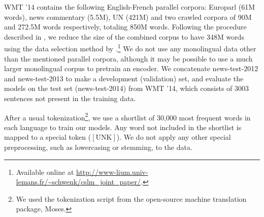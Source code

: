 WMT '14 contains the following English-French parallel corpora: Europarl (61M
words), news commentary (5.5M), UN (421M) and two crawled corpora of 90M and
272.5M words respectively, totaling 850M words. 
Following the procedure described
in \citet{Cho2014}, we reduce the size of the combined corpus to have 348M words
using the data selection method by \citet{Axelrod2011}.\footnote{
    Available online at
    \url{http://www-lium.univ-lemans.fr/~schwenk/cslm_joint_paper/}.
} We do not use any monolingual data other than the mentioned parallel corpora,
although it may be possible to use a much larger monolingual corpus to pretrain
an encoder. We concatenate news-test-2012 and news-test-2013 to make a
development (validation) set, and evaluate the models on the test set
(news-test-2014) from WMT '14, which consists of 3003 sentences not present in
the training data. 

After a usual tokenization\footnote{
    We used the tokenization script from the open-source machine translation
    package, Moses. 
}, 
we use a shortlist of 30,000 most frequent words in each language to train our
models. Any word not included in the shortlist is mapped to a special token
($\left[ \mbox{UNK} \right]$). We do not apply any other special preprocessing,
such as lowercasing or stemming, to the data.

